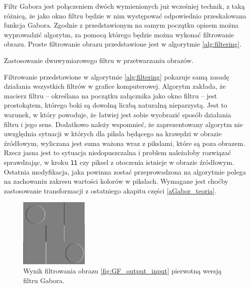 Filtr Gabora jest połączeniem dwóch wymienionych już wcześniej technik, z taką różnicą, że jako okno filtru będzie w nim występować odpowiednio przeskalowana funkcja Gabora. Zgodnie z przedstawionym na samym początku opisem można wyprowadzić algorytm, za pomocą którego będzie można wykonać filtrowanie obrazu. Proste filtrowanie obrazu przedstawione jest w algorytmie \ref{alg:filtering}. \\

\begin{algorithm}
\caption{Zastosowanie dwuwymiarowego filtru w przetwarzaniu obrazów.}
\label{alg:filtering}

\end{algorithm}

Filtrowanie przedstawione w algorytmie \ref{alg:filtering} pokazuje samą zasadę działania wszystkich filtrów w grafice komputerowej. Algorytm zakłada, że macierz filtru -- określana na początku załącznika jako okno filtru -- jest prostokątem, którego boki są dowolną liczbą naturalną nieparzystą. Jest to warunek, w który powoduje, że łatwiej jest sobie wyobrazić sposób działania filtru i jego sens. Dodatkowo należy wspomnieć, że zaprezentowany algorytm nie uwzględnia sytuacji w których dla piksla będącego na krawędzi w obrazie źródłowym, wyliczana jest suma ważona wraz z pikslami, które są poza obrazem. Rzecz jasna jest to sytuacja niedopuszczalna i problem należałoby rozwiązać sprawdzając, w kroku \texttt{11} czy piksel z otoczenia istnieje w obrazie źródłowym. Ostatnia modyfikacja, jaka powinna zostać przeprowadzona na algorytmie polega na zachowaniu zakresu wartości kolorów w pikslach. Wymagane jest choćby zastosowanie transformacji z ostatniego akapitu części \ref{aGabor_teoria}.\\

\begin{figure}[ht]
	\centering
	\includegraphics[width=0.3\textwidth]{images/filtering_example/simple.png}
	\caption{Wynik filtrowania obrazu \ref{fig:GF_output_input} pierwotną wersją filtru Gabora.}
	\label{fig:aGabor_simple_filter_result}
\end{figure}

